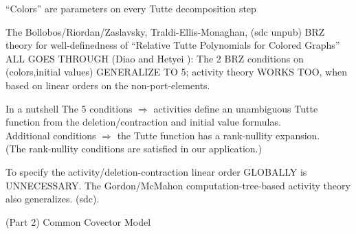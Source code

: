 \documentclass{beamer}
\newcommand{\Remph}[1]{{\color{red}#1}}
\begin{document}
\begin{frame}{``Colors'' are parameters on every Tutte decomposition step}

The Bollobos/Riordan/Zaslavsky\cite{BollobasRiordanTuttePolyColored,MR93a:05047}, Traldi-Ellis-Monaghan\cite{Ellis-Monaghan-Traldi}, (sdc unpub)
BRZ theory for well-definedness
of ``Relative Tutte Polynomials for Colored Graphs'' ALL GOES THROUGH 
(Diao and Hetyei \cite{RelTuttePoly}):
The 2 BRZ conditions on (colors,initial values) GENERALIZE TO 5;
activity theory WORKS TOO, when
based on linear orders on the non-port-elements.

\begin{block}{In a nutshell}
The 5 conditions $\Longrightarrow$ activities define an 
unambiguous Tutte function 
from the deletion/contraction and initial value formulas.\\

Additional conditions $\Longrightarrow$ the Tutte function has a rank-nullity
expansion.\\

\Remph{
(The rank-nullity conditions are satisfied in our application.)}
\end{block}

\begin{block}{To specify the activity/deletion-contraction linear 
order GLOBALLY is 
UNNECESSARY.}
The Gordon/McMahon computation-tree-based 
activity theory also generalizes. (sdc).
\end{block}
\end{frame}




\begin{frame}{(Part 2) Common Covector Model}

\end{frame}
\end{document}
